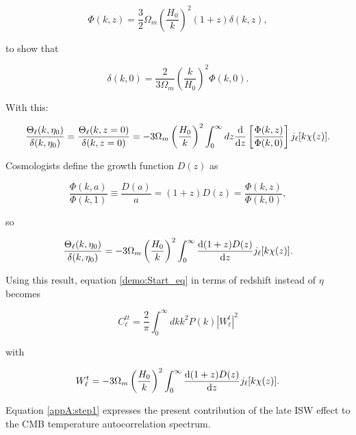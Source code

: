 \documentclass[openany,a4paper,12pt,oneside]{book}
\begin{document}
\begin{spacing}{1.5}
\begin{equation}
	\Phi(k,z)=\frac{3}{2}\Omega_m \left(\frac{H_0}{k}\right)^2(1+z)\delta(k,z),
\end{equation}

\noindent to show that

\begin{equation}
	\delta(k,0)=\frac{2}{3\Omega_m}\left(\frac{k}{H_0}\right)^2\Phi(k,0).
\end{equation}

With this:

\begin{equation}
	\frac{\Theta_\ell(k,\eta_0)}{\delta(k,\eta_0)}=\frac{\Theta_\ell(k,z=0)}{\delta(k,z=0)}=-3\Omega_m\left(\frac{H_0}{k}\right)^2\int_0^\infty dz \dv{}{z}\left[\frac{\Phi(k,z)}{\Phi(k,0)}\right]j_\ell[k\chi(z)].
\end{equation}

Cosmologists define the growth function $D(z)$ as

\begin{equation}
	\frac{\Phi(k,a)}{\Phi(k,1)}\equiv\frac{D(a)}{a}=(1+z)D(z)=\frac{\Phi(k,z)}{\Phi(k,0)},
\end{equation}

so

\begin{equation}
	\frac{\Theta_\ell(k,\eta_0)}{\delta(k,\eta_0)}=-3\Omega_m\left(\frac{H_0}{k}\right)^2\int_0^\infty \dv{(1+z)D(z)}{z}j_\ell[k\chi(z)].
\end{equation}

Using this result, equation \eqref{demo:Start_eq} in terms of redshift instead of $\eta$ becomes

\begin{equation}\label{AppA:eq_final}
	C_\ell^{tt}=\frac{2}{\pi}\int_0^\infty dk k^2P(k)|W_\ell^t|^2
\end{equation}

\noindent with 

\begin{equation}
	W_\ell^t=-3\Omega_m\left(\frac{H_0}{k}\right)^2\int_0^\infty \dv{(1+z)D(z)}{z}j_\ell[k\chi(z)].
\end{equation}

Equation \eqref{appA:step1} expresses the present contribution of the late ISW  effect to the CMB temperature autocorrelation spectrum.

\end{spacing}
\endgroup

\printbibliography
\end{document}
